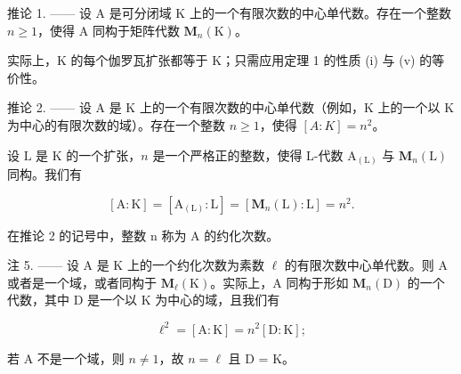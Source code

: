 推论 1. —— 设 A 是可分闭域 K 上的一个有限次数的中心单代数。存在一个整数 \(n \geqslant 1\)，使得 A 同构于矩阵代数 \(\mathbf{M}_{n}(\mathrm{K})\)。

实际上，\(\mathrm{K}\) 的每个伽罗瓦扩张都等于 \(\mathrm{K}\)；只需应用定理 1 的性质 (i) 与 (v) 的等价性。

推论 2. —— 设 A 是 K 上的一个有限次数的中心单代数（例如，K 上的一个以 K 为中心的有限次数的域）。存在一个整数 \(n \geqslant 1\)，使得 \([A : K] = n^{2}\)。

设 \(\mathrm{L}\) 是 \(\mathrm{K}\) 的一个扩张，\(n\) 是一个严格正的整数，使得 L-代数 \(\mathrm{A}_{(\mathrm{L})}\) 与 \(\mathbf{M}_n(\mathrm{L})\) 同构。我们有

\[
[ \mathrm{A}: \mathrm{K} ] = [ \mathrm{A} _ {(\mathrm{L})}: \mathrm{L} ] = [ \mathbf {M} _ {n} (\mathrm{L}): \mathrm{L} ] = n ^ {2}.
\]

在推论 2 的记号中，整数 n 称为 A 的约化次数。

注 5. —— 设 A 是 K 上的一个约化次数为素数 \(\ell\) 的有限次数中心单代数。则 A 或者是一个域，或者同构于 \(\mathbf{M}_{\ell}(\mathrm{K})\)。实际上，A 同构于形如 \(\mathbf{M}_{n}(\mathrm{D})\) 的一个代数，其中 D 是一个以 K 为中心的域，且我们有

\[
\ell^ {2} = [ \mathrm{A}: \mathrm{K} ] = n ^ {2} [ \mathrm{D}: \mathrm{K} ];
\]

若 A 不是一个域，则 \(n \neq 1\)，故 \(n = \ell\) 且 D = K。

